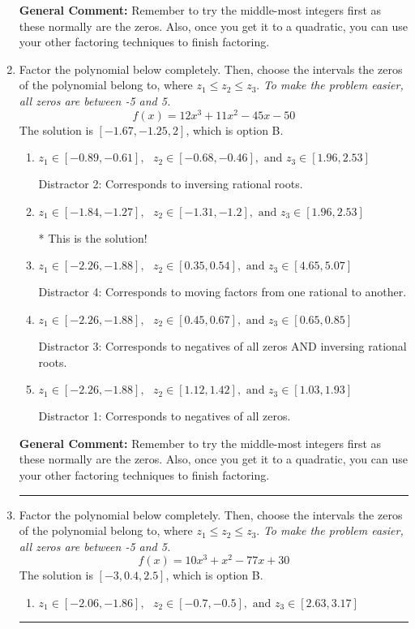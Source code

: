 \documentclass{extbook}[14pt]
\newcommand{\litem}[1]{\item #1

\rule{\textwidth}{0.4pt}}
\begin{document}
\begin{enumerate}
{\textbf{General Comment:} Remember to try the middle-most integers first as these normally are the zeros. Also, once you get it to a quadratic, you can use your other factoring techniques to finish factoring.
}
\litem{
Factor the polynomial below completely. Then, choose the intervals the zeros of the polynomial belong to, where $z_1 \leq z_2 \leq z_3$. \textit{To make the problem easier, all zeros are between -5 and 5.}
\[ f(x) = 12x^{3} +11 x^{2} -45 x -50 \]The solution is \( [-1.67, -1.25, 2] \), which is option B.\begin{enumerate}[label=\Alph*.]
\item \( z_1 \in [-0.89, -0.61], \text{   }  z_2 \in [-0.68, -0.46], \text{   and   } z_3 \in [1.96, 2.53] \)

 Distractor 2: Corresponds to inversing rational roots.
\item \( z_1 \in [-1.84, -1.27], \text{   }  z_2 \in [-1.31, -1.2], \text{   and   } z_3 \in [1.96, 2.53] \)

* This is the solution!
\item \( z_1 \in [-2.26, -1.88], \text{   }  z_2 \in [0.35, 0.54], \text{   and   } z_3 \in [4.65, 5.07] \)

 Distractor 4: Corresponds to moving factors from one rational to another.
\item \( z_1 \in [-2.26, -1.88], \text{   }  z_2 \in [0.45, 0.67], \text{   and   } z_3 \in [0.65, 0.85] \)

 Distractor 3: Corresponds to negatives of all zeros AND inversing rational roots.
\item \( z_1 \in [-2.26, -1.88], \text{   }  z_2 \in [1.12, 1.42], \text{   and   } z_3 \in [1.03, 1.93] \)

 Distractor 1: Corresponds to negatives of all zeros.
\end{enumerate}

\textbf{General Comment:} Remember to try the middle-most integers first as these normally are the zeros. Also, once you get it to a quadratic, you can use your other factoring techniques to finish factoring.
}
\litem{
Factor the polynomial below completely. Then, choose the intervals the zeros of the polynomial belong to, where $z_1 \leq z_2 \leq z_3$. \textit{To make the problem easier, all zeros are between -5 and 5.}
\[ f(x) = 10x^{3} + x^{2} -77 x + 30 \]The solution is \( [-3, 0.4, 2.5] \), which is option B.\begin{enumerate}[label=\Alph*.]
\item \( z_1 \in [-2.06, -1.86], \text{   }  z_2 \in [-0.7, -0.5], \text{   and   } z_3 \in [2.63, 3.17] \)


\end{enumerate}}
\end{enumerate}
\end{document}
